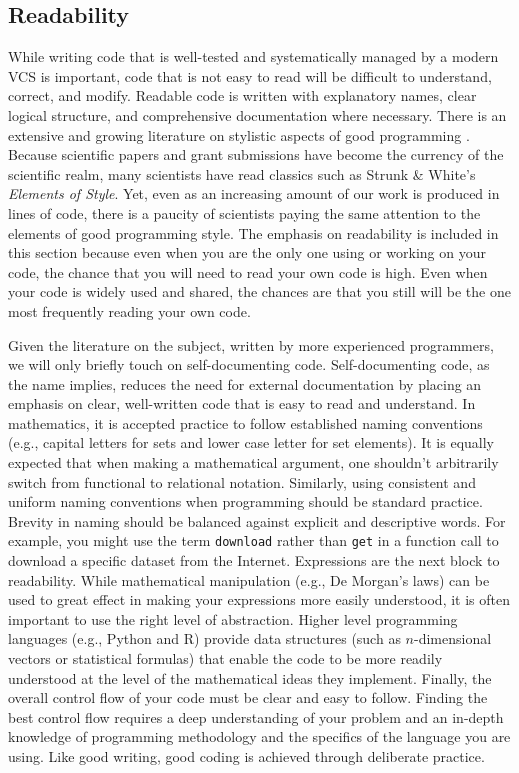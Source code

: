 \documentclass[ChapterTOCs,krantz2]{krantz} %
\begin{document}
\subsection{\label{subsec:readability}Readability}

While writing code that is well-tested and systematically managed by a modern
VCS is important, code that is not easy to read will be difficult to
understand, correct, and modify. Readable code is written with explanatory
names, clear logical structure, and comprehensive documentation where
necessary.  There is an extensive and growing literature on stylistic
aspects of good programming \cite{boswell2011art, Fow00, kernighan1999practice,
HT00, mcconnell2009code}. Because scientific papers and grant submissions have
become the currency of the scientific realm, many scientists have read classics
such as Strunk \& White's \emph{Elements of Style}. Yet, even as an increasing
amount of our work is produced in lines of code, there is a paucity of
scientists paying the same attention to the elements of good programming style.
The emphasis on readability is included in this section because even when you
are the only one using or working on your code, the chance that you will need
to read your own code is high. Even when your code is widely used and shared,
the chances are that you still will be the one most frequently reading your own
code.

Given the literature on the subject, written by more experienced programmers,
we will only briefly touch on self-documenting code. Self-documenting code, as
the name implies, reduces the need for external documentation by placing an
emphasis on clear, well-written code that is easy to read and understand.  In
mathematics, it is accepted practice to follow established naming conventions
(e.g., capital letters for sets and lower case letter for set elements). It is
equally expected that when making a mathematical argument, one shouldn't
arbitrarily switch from functional to relational notation.  Similarly, using
consistent and uniform naming conventions when programming should be standard
practice. Brevity in naming should be balanced against explicit and descriptive
words. For example, you might use the term \texttt{download} rather than
\texttt{get} in a function call to download a specific dataset from the
Internet. Expressions are the next block to readability. While mathematical
manipulation (e.g., De Morgan's laws) can be used to great effect in making
your expressions more easily understood, it is often important to use the right
level of abstraction. Higher level programming languages (e.g., Python and R)
provide data structures (such as $n$-dimensional vectors or statistical
formulas) that enable the code to be more readily understood at the level of
the mathematical ideas they implement. Finally, the overall control flow of
your code must be clear and easy to follow. Finding the best control flow
requires a deep understanding of your problem and an in-depth knowledge of
programming methodology and the specifics of the language you are using.
Like good writing, good coding is achieved through deliberate practice.
\end{document}
